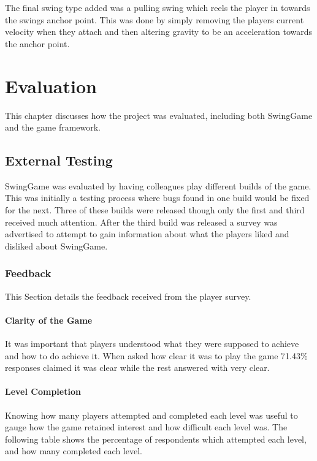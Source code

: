\documentclass[]{report}
\begin{document}
			The final swing type added was a pulling swing which reels the player in towards the swings anchor point. This was done by simply removing the players current velocity when they attach and then altering gravity to be an acceleration towards the anchor point.
		

\chapter{Evaluation}
This chapter discusses how the project was evaluated, including both SwingGame and the game framework.
	\section{External Testing}
	SwingGame was evaluated by having colleagues play different builds of the game. This was initially a testing process where bugs found in one build would be fixed for the next. Three of these builds were released though only the first and third received much attention. After the third build was released a survey was advertised to attempt to gain information about what the players liked and disliked about SwingGame.
		\subsection{Feedback}
		This Section details the feedback received from the player survey.
			\subsubsection{Clarity of the Game}
			It was important that players understood what they were supposed to achieve and how to do achieve it. When asked how clear it was to play the game 71.43\% responses claimed it was clear while the rest answered with very clear.
			\subsubsection{Level Completion}
			Knowing how many players attempted and completed each level was useful to gauge how the game retained interest and how difficult each level was. The following table shows the percentage of respondents which attempted each level, and how many completed each level.
			
\end{document}
